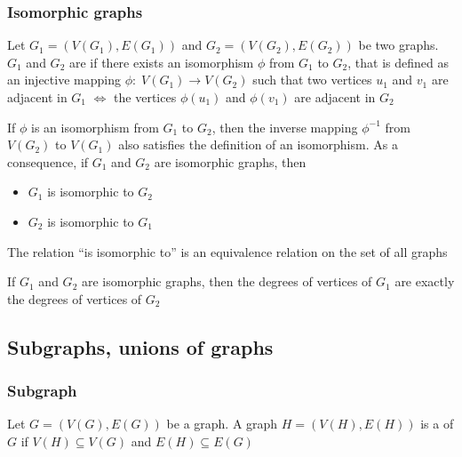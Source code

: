 \documentclass[aspectratio=43]{beamer}
\begin{document}
\begin{frame} \frametitle{Isomorphic graphs} 
\begin{definition}
Let $G_1=(V(G_1),E(G_1))$ and $G_2=(V(G_2),E(G_2))$ be two graphs.
$G_1$ and $G_2$ are  if there exists an isomorphism $\phi$ from $G_1$ to $G_2$, that is defined as an injective mapping $\phi:\; V(G_1) \rightarrow V(G_2)$ such that two vertices $u_1$ and $v_1$ are adjacent in $G_1$ $\iff$ the vertices $\phi(u_1)$ and $\phi(v_1)$ are adjacent in $G_2$
\end{definition}
\end{frame}
 
 
 
\begin{frame}
If $\phi$ is an isomorphism from $G_1$ to $G_2$, then the inverse mapping $\phi ^{-1}$ from $V(G_2)$ to $V(G_1)$ also satisfies the definition of an isomorphism.
As a consequence, if $G_1$ and $G_2$ are isomorphic graphs, then
\begin{itemize}
\item $G_1$ is isomorphic to $G_2$
\item $G_2$ is isomorphic to $G_1$
\end{itemize}
\vfill
\begin{theorem}
The relation ``is isomorphic to'' is an equivalence relation on the set of all graphs
\end{theorem}
\vfill
\begin{theorem}
If $G_1$ and $G_2$ are isomorphic graphs, then the degrees of vertices of $G_1$ are exactly the degrees of vertices of $G_2$
\end{theorem}
\end{frame}



\subsection{Subgraphs, unions of graphs}

\begin{frame}\frametitle{Subgraph}
\begin{definition}[Subgraph]
Let $G=(V(G),E(G))$ be a graph.
A graph $H=(V(H),E(H))$ is a  of $G$ if $V(H)\subseteq V(G)$ and $E(H)\subseteq E(G)$
\end{definition}
\end{frame}
\end{document}
